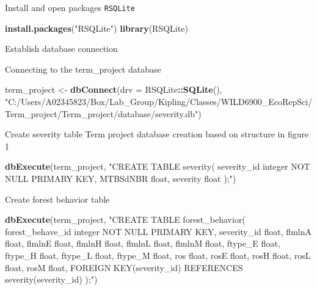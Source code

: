 \documentclass[]{book}
\newenvironment{Shaded}{\begin{snugshade}}{\end{snugshade}}
\newcommand{\DataTypeTok}[1]{\textcolor[rgb]{0.13,0.29,0.53}{#1}}
\newcommand{\KeywordTok}[1]{\textcolor[rgb]{0.13,0.29,0.53}{\textbf{#1}}}
\newcommand{\NormalTok}[1]{#1}
\newcommand{\OperatorTok}[1]{\textcolor[rgb]{0.81,0.36,0.00}{\textbf{#1}}}
\newcommand{\StringTok}[1]{\textcolor[rgb]{0.31,0.60,0.02}{#1}}
\begin{document}
Install and open packages \texttt{RSQLite}

\begin{Shaded}
\begin{Highlighting}[]
\KeywordTok{install.packages}\NormalTok{(}\StringTok{"RSQLite"}\NormalTok{)}
\KeywordTok{library}\NormalTok{(RSQLite)}
\end{Highlighting}
\end{Shaded}

Establish database connection

Connecting to the term\_project database

\begin{Shaded}
\begin{Highlighting}[]
\NormalTok{term_project <-}\StringTok{ }\KeywordTok{dbConnect}\NormalTok{(}\DataTypeTok{drv =}\NormalTok{ RSQLite}\OperatorTok{::}\KeywordTok{SQLite}\NormalTok{(),}
                        \StringTok{"C:/Users/A02345823/Box/Lab_Group/Kipling/Classes/WILD6900_EcoRepSci/Term_project/Term_project/database/severity.db"}\NormalTok{)}
\end{Highlighting}
\end{Shaded}

Create severity table
Term project database creation based on structure in figure 1

\begin{Shaded}
\begin{Highlighting}[]
\KeywordTok{dbExecute}\NormalTok{(term_project, }\StringTok{"CREATE TABLE severity(}
\StringTok{severity_id integer NOT NULL PRIMARY KEY,}
\StringTok{MTBSdNBR float,}
\StringTok{severity float}
\StringTok{);"}\NormalTok{)}
\end{Highlighting}
\end{Shaded}

Create forest behavior table

\begin{Shaded}
\begin{Highlighting}[]
\KeywordTok{dbExecute}\NormalTok{(term_project, }\StringTok{"CREATE TABLE forest_behavior(}
\StringTok{forest_behave_id integer NOT NULL PRIMARY KEY,}
\StringTok{severity_id float,}
\StringTok{flmlnA float,}
\StringTok{flmlnE float,}
\StringTok{flmlnH float,}
\StringTok{flmlnL float,}
\StringTok{flmlnM float,}
\StringTok{ftype_E float,}
\StringTok{ftype_H float,}
\StringTok{ftype_L float,}
\StringTok{ftype_M float,}
\StringTok{ros float,}
\StringTok{rosE float,}
\StringTok{rosH float,}
\StringTok{rosL float,}
\StringTok{rosM float,}
\StringTok{FOREIGN KEY(severity_id) REFERENCES severity(severity_id)}
\StringTok{);"}\NormalTok{)}
\end{Highlighting}
\end{Shaded}
\end{document}
